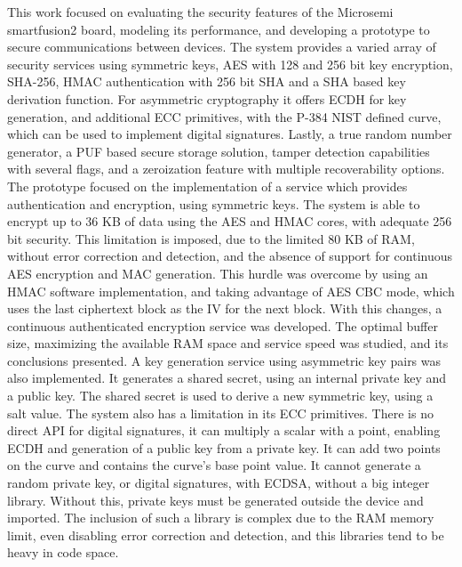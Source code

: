 \cleardoublepage
\label{chap:conclusion}

This work focused on evaluating the security features of the Microsemi smartfusion2 board, modeling its performance, and developing a prototype to secure communications between devices.
The system provides a varied array of security services using symmetric keys, AES with 128 and 256 bit key encryption, SHA-256, HMAC authentication with 256 bit SHA and a SHA based key derivation function. For asymmetric cryptography it offers ECDH for key generation, and additional ECC primitives, with the P-384 NIST defined curve, which can be used to implement digital signatures. Lastly, a true random number generator, a PUF based secure storage solution, tamper detection capabilities with several flags, and a zeroization feature with multiple recoverability options.
The prototype focused on the implementation of a service which provides authentication and encryption, using symmetric keys. The system is able to encrypt up to 36 KB of data using the AES and HMAC cores, with adequate 256 bit security. This limitation is imposed, due to the limited 80 KB of RAM, without error correction and detection, and the absence of support for continuous AES encryption and MAC generation. This hurdle was overcome by using an HMAC software implementation, and taking advantage of AES CBC mode, which uses the last ciphertext block as the IV for the next block. With this changes, a continuous authenticated encryption service was developed. The optimal buffer size, maximizing the available RAM space and service speed was studied, and its conclusions presented.
A key generation service using asymmetric key pairs was also implemented. It generates a shared secret, using an internal private key and a public key. The shared secret is used to derive a new symmetric key, using a salt value.
The system also has a limitation in its ECC primitives. There is no direct API for digital signatures, it can multiply a scalar with a point, enabling ECDH and generation of a public key from a private key. It can add two points on the curve and contains the curve's base point value. It cannot generate a random private key, or digital signatures, with ECDSA, without a big integer library. Without this, private keys must be generated outside the device and imported. The inclusion of such a library is complex due to the RAM memory limit, even disabling error correction and detection, and this libraries tend to be heavy in code space. 
